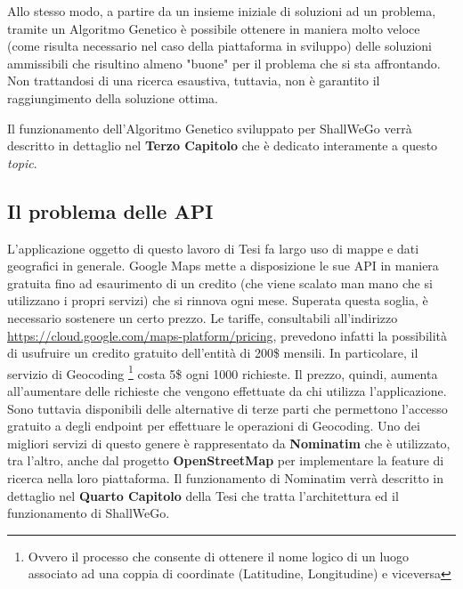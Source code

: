            Allo stesso modo, a partire da un insieme iniziale di soluzioni ad un problema, tramite un Algoritmo Genetico è possibile ottenere in maniera molto veloce (come risulta necessario nel caso della piattaforma in sviluppo) delle soluzioni ammissibili che risultino almeno "buone" per il problema che si sta affrontando. Non trattandosi di una ricerca esaustiva, tuttavia, non è garantito il raggiungimento della soluzione ottima.

            Il funzionamento dell'Algoritmo Genetico sviluppato per ShallWeGo verrà descritto in dettaglio nel \textbf{Terzo Capitolo} che è dedicato interamente a questo \textit{topic}.

        \subsection{Il problema delle API}
            L'applicazione oggetto di questo lavoro di Tesi fa largo uso di mappe e dati geografici in generale. Google Maps mette a disposizione le sue API in maniera gratuita fino ad esaurimento di un credito (che viene scalato man mano che si utilizzano i propri servizi) che si rinnova ogni mese. Superata questa soglia, è necessario sostenere un certo prezzo.
            Le tariffe, consultabili all'indirizzo \url{https://cloud.google.com/maps-platform/pricing}, prevedono infatti la possibilità di usufruire un credito gratuito dell'entità di 200\$ mensili. In particolare, il servizio di Geocoding \footnote[1]{Ovvero il processo che consente di ottenere il nome logico di un luogo associato ad una coppia di coordinate (Latitudine, Longitudine) e viceversa} costa 5\$ ogni 1000 richieste. Il prezzo, quindi, aumenta all'aumentare delle richieste che vengono effettuate da chi utilizza l'applicazione.
            Sono tuttavia disponibili delle alternative di terze parti che permettono l'accesso gratuito a degli endpoint per effettuare le operazioni di Geocoding. Uno dei migliori servizi di questo genere è rappresentato da \textbf{Nominatim} che è utilizzato, tra l'altro, anche dal progetto \textbf{OpenStreetMap} per implementare la feature di ricerca nella loro piattaforma. Il funzionamento di Nominatim verrà descritto in dettaglio nel \textbf{Quarto Capitolo} della Tesi che tratta l'architettura ed il funzionamento di ShallWeGo.
    
